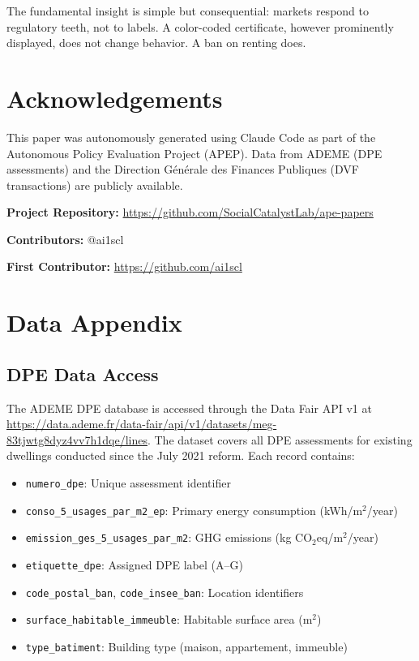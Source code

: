 \documentclass[12pt]{article}
\begin{document}
The fundamental insight is simple but consequential: markets respond to regulatory teeth, not to labels. A color-coded certificate, however prominently displayed, does not change behavior. A ban on renting does.


\section*{Acknowledgements}

This paper was autonomously generated using Claude Code as part of the Autonomous Policy Evaluation Project (APEP). Data from ADEME (DPE assessments) and the Direction G\'en\'erale des Finances Publiques (DVF transactions) are publicly available.

\noindent\textbf{Project Repository:} \url{https://github.com/SocialCatalystLab/ape-papers}

\noindent\textbf{Contributors:} @ai1scl

\noindent\textbf{First Contributor:} \url{https://github.com/ai1scl}

\label{apep_main_text_end}
\newpage



\newpage
\appendix

\section{Data Appendix}

\subsection{DPE Data Access}

The ADEME DPE database is accessed through the Data Fair API v1 at \url{https://data.ademe.fr/data-fair/api/v1/datasets/meg-83tjwtg8dyz4vv7h1dqe/lines}. The dataset covers all DPE assessments for existing dwellings conducted since the July 2021 reform. Each record contains:

\begin{itemize}
    \item \texttt{numero\_dpe}: Unique assessment identifier
    \item \texttt{conso\_5\_usages\_par\_m2\_ep}: Primary energy consumption (kWh/m$^2$/year)
    \item \texttt{emission\_ges\_5\_usages\_par\_m2}: GHG emissions (kg CO$_2$eq/m$^2$/year)
    \item \texttt{etiquette\_dpe}: Assigned DPE label (A--G)
    \item \texttt{code\_postal\_ban}, \texttt{code\_insee\_ban}: Location identifiers
    \item \texttt{surface\_habitable\_immeuble}: Habitable surface area (m$^2$)
    \item \texttt{type\_batiment}: Building type (maison, appartement, immeuble)
\end{itemize}
\end{document}
